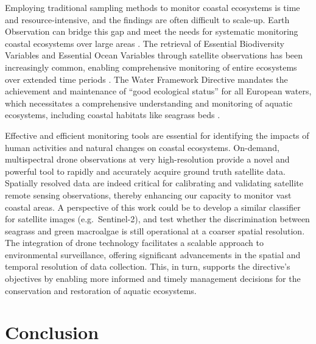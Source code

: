 \documentclass[
  number]{elsarticle}
\begin{document}
Employing traditional sampling methods to monitor coastal ecosystems is
time and resource-intensive, and the findings are often difficult to
scale-up. Earth Observation can bridge this gap and meet the needs for
systematic monitoring coastal ecosystems over large areas
\citep{papathanasopoulou2019satellite}. The retrieval of Essential
Biodiversity Variables and Essential Ocean Variables through satellite
observations has been increasingly common, enabling comprehensive
monitoring of entire ecosystems over extended time periods
\citetext{\citealp[ ]{ratnarajah2023monitoring}; \citealp{Zoffoli2021}}.
The Water Framework Directive \citep{WFD2000} mandates the achievement
and maintenance of ``good ecological status'' for all European waters,
which necessitates a comprehensive understanding and monitoring of
aquatic ecosystems, including coastal habitats like seagrass beds
\citetext{\citealp[ ]{foden2007angiosperms}; \citealp[
]{nordlund2024one}; \citealp{Zoffoli2021}}.

Effective and efficient monitoring tools are essential for identifying
the impacts of human activities and natural changes on coastal
ecosystems. On-demand, multispectral drone observations at very
high-resolution provide a novel and powerful tool to rapidly and
accurately acquire ground truth satellite data. Spatially resolved data
are indeed critical for calibrating and validating satellite remote
sensing observations, thereby enhancing our capacity to monitor vast
coastal areas. A perspective of this work could be to develop a similar
classifier for satellite images (e.g.~Sentinel-2), and test whether the
discrimination between seagrass and green macroalgae is still
operational at a coarser spatial resolution. The integration of drone
technology facilitates a scalable approach to environmental
surveillance, offering significant advancements in the spatial and
temporal resolution of data collection. This, in turn, supports the
directive's objectives by enabling more informed and timely management
decisions for the conservation and restoration of aquatic ecosystems.

\section{Conclusion}\label{conclusion}
\end{document}
